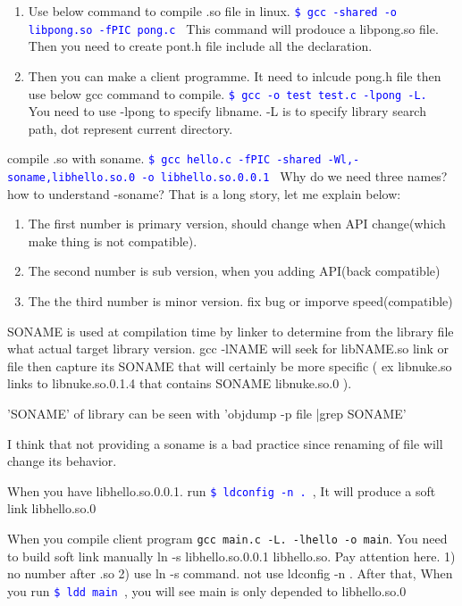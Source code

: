 \documentclass[paper=8.5in:11in, twoside, 12pt, pagesize=pdftex]{book}
\newcommand{\linuxcommand}[1]{\texttt{\textcolor{blue}{\$ #1 \Pisymbol{psy}{191}}}}
\begin{document}
	\begin{enumerate}
	\item Use below command to compile .so file in linux. 
   \linuxcommand{gcc -shared -o libpong.so -fPIC pong.c} 
   This command will prodouce a libpong.so file. Then you need to create pont.h file include all the declaration. 
   
   \item Then you can make a client programme. It need to inlcude pong.h file then use below gcc command to compile. 
	\linuxcommand{gcc -o test test.c -lpong -L.}
	You need to use -lpong to specify libname. -L is to specify library search path, dot represent current directory.        
	\end{enumerate}

    compile .so with soname. \linuxcommand{gcc hello.c -fPIC -shared -Wl,-soname,libhello.so.0 -o libhello.so.0.0.1} Why do we need three names? how to understand -soname? That is a long story, let me explain below:
\begin{enumerate}
	\item The first number is primary version, should change when API change(which make thing is not compatible).
	
	\item The second number is sub version, when you adding API(back compatible)
	
	\item The the third number is minor version. fix bug or imporve speed(compatible)
\end{enumerate}				
		 
SONAME is used at compilation time by linker to determine from the library file what actual target library version. gcc -lNAME will seek for libNAME.so link or file then capture its SONAME that will certainly be more specific ( ex libnuke.so links to libnuke.so.0.1.4 that contains SONAME libnuke.so.0 ).

'SONAME' of library can be seen with 'objdump -p file |grep SONAME'

I think that not providing a soname is a bad practice since renaming of file will change its behavior.
		
		When you have libhello.so.0.0.1. run \linuxcommand{ldconfig -n .}, It will produce a soft link libhello.so.0
		
		When you compile client program
		\verb=gcc main.c -L. -lhello -o main=. You need to build soft link manually 
		ln -s libhello.so.0.0.1 libhello.so. Pay attention here. 1) no number after .so 2) use ln -s command. not use ldconfig -n . After that, When you run \linuxcommand{ldd main}, you will see main is only depended to libhello.so.0
		
\end{document}
